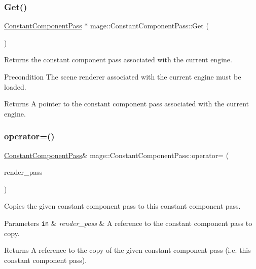 \subsubsection{\texorpdfstring{Get()}{Get()}}
{\footnotesize\ttfamily \hyperlink{classmage_1_1_constant_component_pass}{Constant\+Component\+Pass} $\ast$ mage\+::\+Constant\+Component\+Pass\+::\+Get (\begin{DoxyParamCaption}{ }\end{DoxyParamCaption})\hspace{0.3cm}{\ttfamily [static]}}

Returns the constant component pass associated with the current engine.

\begin{DoxyPrecond}{Precondition}
The scene renderer associated with the current engine must be loaded. 
\end{DoxyPrecond}
\begin{DoxyReturn}{Returns}
A pointer to the constant component pass associated with the current engine. 
\end{DoxyReturn}
\hypertarget{classmage_1_1_constant_component_pass_a513b83527fdb17a760032b76f3c17012}{}\label{classmage_1_1_constant_component_pass_a513b83527fdb17a760032b76f3c17012} 
\subsubsection{\texorpdfstring{operator=()}{operator=()}\hspace{0.1cm}{\footnotesize\ttfamily [1/2]}}
{\footnotesize\ttfamily \hyperlink{classmage_1_1_constant_component_pass}{Constant\+Component\+Pass}\& mage\+::\+Constant\+Component\+Pass\+::operator= (\begin{DoxyParamCaption}\item[{const \hyperlink{classmage_1_1_constant_component_pass}{Constant\+Component\+Pass} \&}]{render\+\_\+pass }\end{DoxyParamCaption})\hspace{0.3cm}{\ttfamily [delete]}}

Copies the given constant component pass to this constant component pass.


\begin{DoxyParams}[1]{Parameters}
\mbox{\tt in}  & {\em render\+\_\+pass} & A reference to the constant component pass to copy. \\
\hline
\end{DoxyParams}
\begin{DoxyReturn}{Returns}
A reference to the copy of the given constant component pass (i.\+e. this constant component pass). 
\end{DoxyReturn}
\hypertarget{classmage_1_1_constant_component_pass_ab1944cfe6c59d28d34fb6c6d05bd0b96}{}\label{classmage_1_1_constant_component_pass_ab1944cfe6c59d28d34fb6c6d05bd0b96} 
